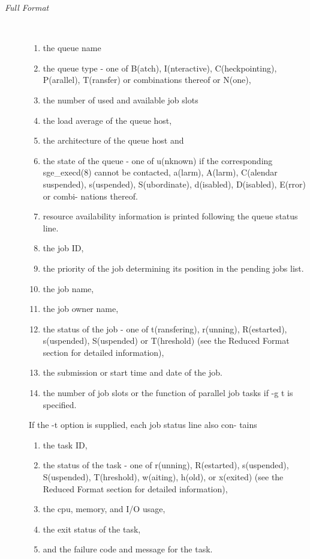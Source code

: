\documentclass[11pt,final,oneside]{fithesis}
\begin{document}
\begin{description}
\item[\emph{Full Format}]
\\
\begin{enumerate}
\item[] the queue name
\item[] the  queue  type  -  one   of   B(atch),   I(nteractive),
        C(heckpointing),  P(arallel),  T(ransfer) or combinations
        thereof or N(one),
\item[] the number of used and available job slots
\item[] the load average of the queue host,
\item[] the architecture of the queue host and
\item[] the state  of  the  queue  -  one  of  u(nknown)  if  the
        corresponding  sge_execd(8) cannot be contacted, a(larm),
        A(larm),     C(alendar      suspended),      s(uspended),
        S(ubordinate),  d(isabled), D(isabled), E(rror) or combi-
        nations thereof.
\item[] resource availability information
     is  printed  following  the  queue  status  line.  
\item[] the job ID,
\item[] the priority of the job determining its position  in  the
        pending  jobs  list. 
\item[] the job name,
\item[] the job owner name,
\item[] the status of the job - one of t(ransfering),  r(unning),
        R(estarted), s(uspended), S(uspended) or T(hreshold) (see
        the Reduced Format section for detailed information),
\item[] the submission or start time and date of the job.
\item[] the number of job slots or the function of  parallel  job
        tasks if -g t is specified.
\end{enumerate}

If the -t option is supplied, each job status line also con-
     tains
     \begin{enumerate}

\item[] the task ID,
\item[] the status of the task - one of  r(unning),  R(estarted),
        s(uspended), S(uspended), T(hreshold), w(aiting), h(old),
        or x(exited) (see the Reduced Format section for detailed
        information),
\item[] the cpu, memory, and I/O usage,
\item[] the exit status of the task,
\item[] and the failure code and message for the task.
\end{enumerate}
\end{description}
 
\end{document}
